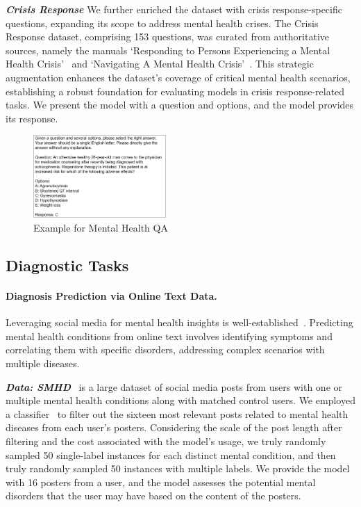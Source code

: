 \textbf{\textit{Crisis Response}} We further enriched the dataset with crisis response-specific questions, expanding its scope to address mental health crises. The Crisis Response dataset, comprising 153 questions, was curated from authoritative sources, namely the manuals `Responding to Persons Experiencing a Mental Health Crisis'~\cite{responding_manual} and `Navigating A Mental Health Crisis'~\cite{navigating_manual}. This strategic augmentation enhances the dataset's coverage of critical mental health scenarios, establishing a robust foundation for evaluating models in crisis response-related tasks. We present the model with a question and options, and the model provides its response.

\begin{figure}[ht]
    \centering
    \includegraphics[width=0.45\textwidth]{Figure/Mental_Health_QA.png}
    \caption{Example for Mental Health QA}
    \label{fig: mental health QA}
\end{figure}


   
\subsection{Diagnostic Tasks}
    
\paragraph*{Diagnosis Prediction via Online Text Data.} Leveraging social media for mental health insights is well-established~\cite{chancellor2020methods, culotta2014estimating}. Predicting mental health conditions from online text involves identifying symptoms and correlating them with specific disorders, addressing complex scenarios with multiple diseases.

\textbf{\textit{Data: SMHD}}~\cite{cohan-etal-2018-smhd} is a large dataset of social media posts from users with one or multiple mental health conditions along with matched control users. We employed a classifier~\cite{zhang-etal-2022-symptom} to filter out the sixteen most relevant posts related to mental health diseases from each user's posters. Considering the scale of the post length after filtering and the cost associated with the model's usage, we truly randomly sampled 50 single-label instances for each distinct mental condition, and then truly randomly sampled 50 instances with multiple labels. We provide the model with 16 posters from a user, and the model assesses the potential mental disorders that the user may have based on the content of the posters. 

